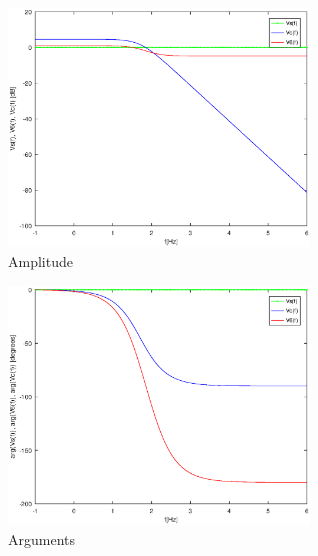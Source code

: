 \begin{figure}[H]
\centering
\includegraphics[width = 8cm]{Amplitude.eps}
\caption {Amplitude}
\end{figure}

\begin{figure}[H]
\centering
\includegraphics[width = 8cm]{Arguments.eps}
\caption {Arguments}
\end{figure}
















